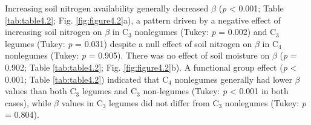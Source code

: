 Increasing soil nitrogen availability generally decreased $\beta$  (\textit{p} < 0.001; Table \ref{tab:table4.2}; Fig. \ref{fig:figure4.2}a), a pattern driven by a negative effect of increasing soil nitrogen on $\beta$  in C$_3$ nonlegumes (Tukey: \textit{p} = 0.002) and C$_3$ legumes (Tukey: \textit{p} = 0.031) despite a null effect of soil nitrogen on $\beta$ in C$_4$ nonlegumes (Tukey: \textit{p} = 0.905). There was no effect of soil moisture on $\beta$  (\textit{p} = 0.902; Table \ref{tab:table4.2}; Fig. \ref{fig:figure4.2}b). A functional group effect (\textit{p} < 0.001; Table \ref{tab:table4.2}) indicated that C$_4$ nonlegumes generally had lower $\beta$ values than both C$_3$ legumes and C$_3$ non-legumes (Tukey: \textit{p} < 0.001 in both cases), while $\beta$ values in C$_3$ legumes did not differ from C$_3$ nonlegumes (Tukey: \textit{p} = 0.804).

